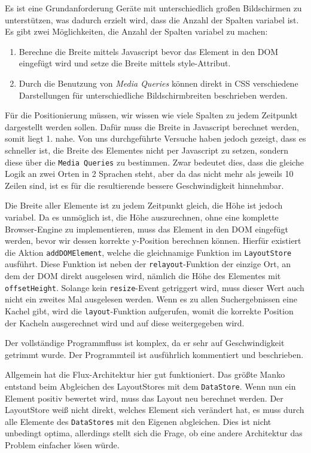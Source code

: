 \documentclass[12pt,twoside]{book}
\begin{document}
Es ist eine Grundanforderung Geräte mit unterschiedlich großen Bildschirmen zu unterstützen, was dadurch erzielt wird, dass die Anzahl der Spalten variabel ist.
Es gibt zwei Möglichkeiten, die Anzahl der Spalten variabel zu machen:

\begin{enumerate}
  \item Berechne die Breite mittels Javascript bevor das Element in den DOM eingefügt wird und setze die Breite mittels style-Attribut.
  \item Durch die Benutzung von \textit{Media Queries} können direkt in CSS verschiedene Darstellungen für unterschiedliche Bildschirmbreiten beschrieben werden.
\end{enumerate}

Für die Positionierung müssen, wir wissen wie viele Spalten zu jedem Zeitpunkt dargestellt werden sollen. Dafür muss die Breite in Javascript berechnet werden, somit liegt 1. nahe. Von uns durchgeführte Versuche haben jedoch gezeigt, dass es schneller ist, die Breite des Elementes nicht per Javascript zu setzen, sondern diese über die \texttt{Media Queries} zu bestimmen. Zwar bedeutet dies, dass die gleiche Logik an zwei Orten in 2 Sprachen steht, aber da das nicht mehr als jeweils 10 Zeilen sind, ist es für die resultierende bessere Geschwindigkeit hinnehmbar.

Die Breite aller Elemente ist zu jedem Zeitpunkt gleich, die Höhe ist jedoch variabel. Da es unmöglich ist, die Höhe auszurechnen, ohne eine komplette Browser-Engine zu implementieren, muss das Element in den DOM eingefügt werden, bevor wir dessen korrekte y-Position berechnen können. Hierfür existiert die Aktion \texttt{addDOMElement}, welche die gleichnamige Funktion im \texttt{LayoutStore} ausführt. Diese Funktion ist neben der \texttt{relayout}-Funktion der einzige Ort, an dem der DOM direkt ausgelesen wird, nämlich die Höhe des Elementes mit \texttt{offsetHeight}. Solange kein \texttt{resize}-Event getriggert wird, muss dieser Wert auch nicht ein zweites Mal ausgelesen werden.
Wenn es zu allen Suchergebnissen eine Kachel gibt, wird die \texttt{layout}-Funktion aufgerufen, womit die korrekte Position der Kacheln ausgerechnet wird und auf diese weitergegeben wird.

Der vollständige Programmfluss ist komplex, da er sehr auf Geschwindigkeit getrimmt wurde. Der Programmteil ist ausführlich kommentiert und beschrieben.

Allgemein hat die Flux-Architektur hier gut funktioniert. Das größte Manko entstand beim Abgleichen des LayoutStores mit dem \texttt{DataStore}. Wenn nun ein Element positiv bewertet wird, muss das Layout neu berechnet werden. Der LayoutStore weiß nicht direkt, welches Element sich verändert hat, es muss durch alle Elemente des \texttt{DataStores} mit den Eigenen abgleichen. Dies ist nicht unbedingt optima, allerdings stellt sich die Frage, ob eine andere Architektur das Problem einfacher lösen würde.
\end{document}
